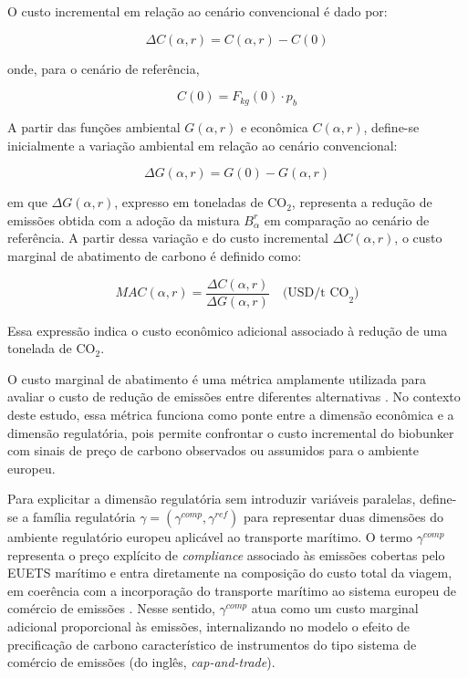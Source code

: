 O custo incremental em relação ao cenário convencional é dado por:

\begin{equation}
\Delta C(\alpha,r) = C(\alpha,r) - C(0)
\end{equation}

onde, para o cenário de referência,

\[
C(0) = F_{kg}(0) \cdot p_b
\]

A partir das funções ambiental $G(\alpha,r)$ e econômica $C(\alpha,r)$, define-se inicialmente a variação ambiental em relação ao cenário convencional:

\begin{equation}
\Delta G(\alpha,r) = G(0) - G(\alpha,r)
\end{equation}

em que $\Delta G(\alpha,r)$, expresso em toneladas de CO$_2$, representa a redução de emissões obtida com a adoção da mistura $B_{\alpha}^{r}$ em comparação ao cenário de referência. A partir dessa variação e do custo incremental $\Delta C(\alpha,r)$, o custo marginal de abatimento de carbono é definido como:

\begin{equation}
MAC(\alpha,r) =
\frac{\Delta C(\alpha,r)}
{\Delta G(\alpha,r)}
\quad \text{(USD/t CO}_2\text{)}
\end{equation}

Essa expressão indica o custo econômico adicional associado à redução de uma tonelada de CO$_2$.

O custo marginal de abatimento é uma métrica amplamente utilizada para avaliar o custo de redução de emissões entre diferentes alternativas \citep{mckinsey2009}. No contexto deste estudo, essa métrica funciona como ponte entre a dimensão econômica e a dimensão regulatória, pois permite confrontar o custo incremental do biobunker com sinais de preço de carbono observados ou assumidos para o ambiente europeu.


Para explicitar a dimensão regulatória sem introduzir variáveis paralelas, define-se a família regulatória $\gamma = (\gamma^{comp},\gamma^{ref})$ para representar duas dimensões do ambiente regulatório europeu aplicável ao transporte marítimo. O termo $\gamma^{comp}$ representa o preço explícito de \emph{compliance} associado às emissões cobertas pelo \gls{EUETS} marítimo e entra diretamente na composição do custo total da viagem, em coerência com a incorporação do transporte marítimo ao sistema europeu de comércio de emissões \citep{eu_reg_2023_957,euets2023}. Nesse sentido, $\gamma^{comp}$ atua como um custo marginal adicional proporcional às emissões, internalizando no modelo o efeito de precificação de carbono característico de instrumentos do tipo sistema de comércio de emissões (do inglês, \emph{cap-and-trade}).

